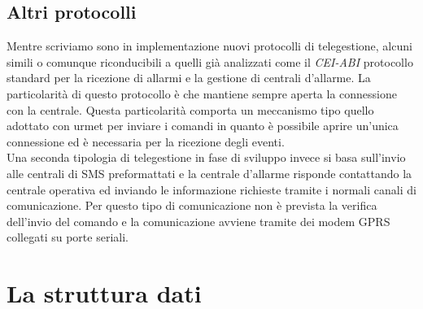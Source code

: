 \subsection{Altri protocolli}
Mentre scriviamo sono in implementazione nuovi protocolli di telegestione, alcuni simili o comunque riconducibili a quelli già analizzati come il \emph{CEI-ABI} protocollo standard per la ricezione di allarmi e la gestione di centrali d'allarme. La particolarità di questo protocollo è che mantiene sempre aperta la connessione con la centrale. Questa particolarità comporta un meccanismo tipo quello adottato con urmet per inviare i comandi in quanto è possibile aprire un'unica connessione ed è necessaria per la ricezione degli eventi.\\
Una seconda tipologia di telegestione in fase di sviluppo invece si basa sull'invio alle centrali di SMS preformattati e la centrale d'allarme risponde contattando la centrale operativa ed inviando le informazione richieste tramite i normali canali di comunicazione. Per questo tipo di comunicazione non è prevista la verifica dell'invio del comando e la comunicazione avviene tramite dei modem GPRS collegati su porte seriali.
\section{La struttura dati}